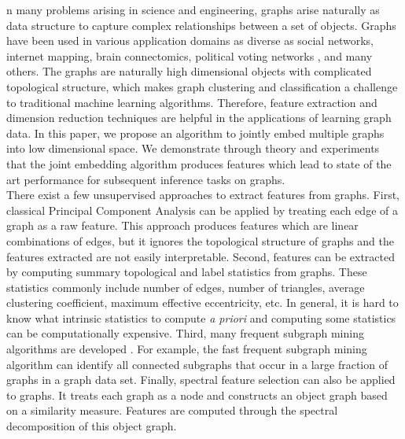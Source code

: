 \documentclass[10pt,journal,compsoc]{IEEEtran}
\begin{document}
\IEEEdisplaynontitleabstractindextext
\IEEEpeerreviewmaketitle


\noindent {}n many problems arising in science and engineering, graphs arise naturally as data structure to capture complex relationships between a set of objects. Graphs have been used in various application domains as diverse as social networks\cite{otte2002social}, internet mapping\cite{govindan2000heuristics}, brain connectomics\cite{bullmore2011brain}, political voting networks \cite{ward2011network},  and many others. The graphs are naturally high dimensional objects with complicated topological structure, which makes graph clustering and classification a challenge to traditional machine learning algorithms. Therefore, feature extraction and dimension reduction techniques are helpful in the applications of learning graph data. In this paper, we propose an algorithm to jointly embed multiple graphs into low dimensional space. We demonstrate through theory and experiments that the joint embedding algorithm produces features which lead to state of the art performance for subsequent inference tasks on graphs.  \\

\noindent There exist a few unsupervised approaches to extract features from graphs. First, classical Principal Component Analysis can be applied by treating each edge of a graph as a raw feature\cite{jolliffe2002principal}. This approach produces features which are linear combinations of edges, but it ignores the topological structure of graphs and the features extracted are not easily interpretable. Second, features can be extracted by computing summary topological and label statistics from graphs\cite{li2011graph,park2013anomaly}. These statistics commonly include number of edges, number of triangles, average clustering coefficient, maximum effective eccentricity, etc. In general, it is hard to know what intrinsic statistics to compute \textit{a priori} and computing some statistics can be computationally expensive. Third, many frequent subgraph mining algorithms are developed \cite{jiang2013survey}. For example, the fast frequent subgraph mining algorithm can identify all connected subgraphs that occur in a large fraction of graphs in a graph data set\cite{huan2003efficient}. Finally, spectral feature selection can also be applied to graphs. It treats each graph as a node and constructs an object graph based on a similarity measure. Features are computed through the spectral decomposition of this object graph\cite{zhao2007spectral}. \\
\end{document}
